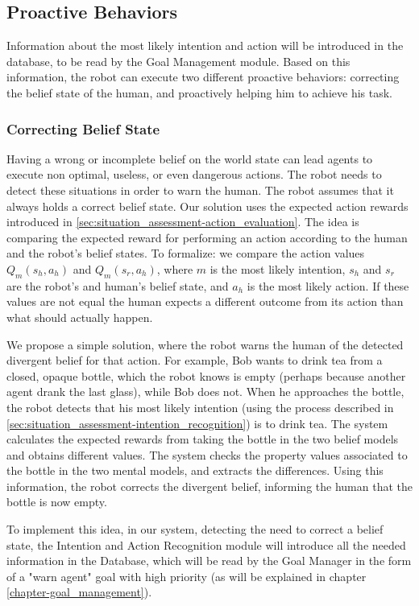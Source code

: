 \subsection{Proactive Behaviors}
\label{subsec:situation_assessment-proactive_behaviors}
Information about the most likely intention and action will be introduced in the database, to be read by the Goal Management module. Based on this information, the robot can execute two different proactive behaviors: correcting the belief state of the human, and proactively helping him to achieve his task.

\subsubsection{Correcting Belief State}
Having a wrong or incomplete belief on the world state can lead agents to execute non optimal, useless, or even dangerous actions. The robot needs to detect these situations in order to warn the human. The robot assumes that it always holds a correct belief state. Our solution uses the expected action rewards introduced in \ref{sec:situation_assessment-action_evaluation}. The idea is comparing the expected reward for performing an action according to the human and the robot's belief states. To formalize: we compare the action values \(Q_m(s_h,a_h)\) and \(Q_m(s_r,a_h)\), where $m$ is the most likely intention,  $s_h$ and $s_r$ are the robot's and human's belief state, and $a_h$ is the most likely action. If these values are not equal the human expects a different outcome from its action than what should actually happen. 

We propose a simple solution, where the robot warns the human of the detected divergent belief for that action. For example, Bob wants to drink tea from a closed, opaque bottle, which the robot knows is empty (perhaps because another agent drank the last glass), while Bob does not. When he approaches the bottle, the robot detects that his most likely intention (using the process described in \ref{sec:situation_assessment-intention_recognition}) is to drink tea. The system calculates the expected rewards from taking the bottle in the two belief models and obtains different values. The system checks the property values associated to the bottle in the two mental models, and extracts the differences. Using this information, the robot corrects the divergent belief, informing the human that the bottle is now empty. 

To implement this idea, in our system, detecting the need to correct a belief state, the Intention and Action Recognition module will introduce all the needed information in the Database, which will be read by the Goal Manager in the form of a "warn agent" goal with high priority (as will be explained in chapter \ref{chapter-goal_management}).

